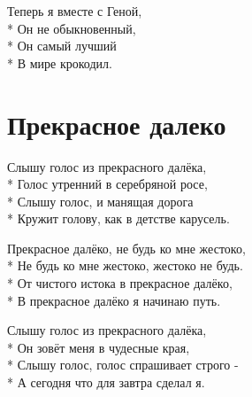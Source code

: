 \medskip

\begin{minipage}{\linewidth}
Теперь я вместе с Геной,\\*
Он не обыкновенный,\\*
Он самый лучший\\*
В мире крокодил.\\
\end{minipage}

\vspace{\fill}\newpage

\section{Прекрасное далеко}
\label{song:Прекрасное_далеко}

\medskip

\begin{minipage}{\linewidth}
Слышу голос из прекрасного далёка,\\*
Голос утренний в серебряной росе,\\*
Слышу голос, и манящая дорога\\*
Кружит голову, как в детстве карусель.\\
\end{minipage}\par\medskip\nobreak

\medskip

\begin{minipage}{\linewidth}
\hspace*{1.5em}Прекрасное далёко, не будь ко мне жестоко,\\*
\hspace*{1.5em}Не будь ко мне жестоко, жестоко не будь.\\*
\hspace*{1.5em}От чистого истока в прекрасное далёко,\\*
\hspace*{1.5em}В прекрасное далёко я начинаю путь.\\
\end{minipage}\par\medskip\nobreak

\medskip

\begin{minipage}{\linewidth}
Слышу голос из прекрасного далёка,\\*
Он зовёт меня в чудесные края,\\*
Слышу голос, голос спрашивает строго -\\*
А сегодня что для завтра сделал я.\\
\end{minipage}\par\medskip\nobreak


